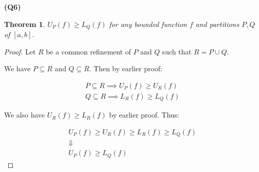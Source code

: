 \documentclass[12pt, a4paper]{article}
\newcommand{\sse}{\subseteq}
\newcommand{\lsum}[2]{L_{#1}(#2)}
\newcommand{\usum}[2]{U_{#1}(#2)}
\newtheorem{theorem}{Theorem}
\begin{document}
\textbf{(Q6)}

\begin{theorem}
    $\usum{P}{f} \geq \lsum{Q}{f}$ for any bounded function $f$ and partitions $P, Q$ of $[a, b]$.
\end{theorem}

\begin{proof}
    Let $R$ be a common refinement of $P$ and $Q$ such that $R = P \cup Q$.

    We have $P \sse R$ and $Q \sse R$. Then by earlier proof:

    \begin{gather*}
        P \sse R \implies \usum{P}{f} \geq \usum{R}{f}\\
        Q \sse R \implies \lsum{R}{f} \geq \lsum{Q}{f}
    \end{gather*}

    We also have $\usum{R}{f} \geq \lsum{R}{f}$ by earlier proof. Thus:

    \begin{gather*}
        \usum{P}{f} \geq \usum{R}{f} \geq \lsum{R}{f} \geq \lsum{Q}{f}\\
        \Downarrow\\
        \usum{P}{f} \geq \lsum{Q}{f}
    \end{gather*}

    
\end{proof}
\end{document}

